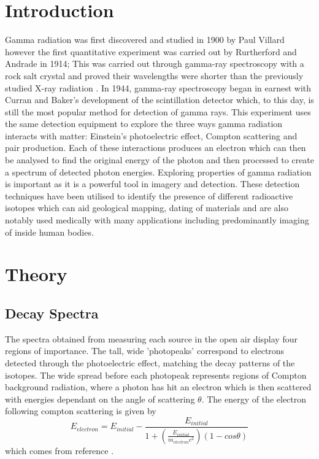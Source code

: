 \documentclass[11pt]{article} %
\newcommand{\citet}{\cite} %
\begin{document}
\newpage %

\section{Introduction} 
\label{intro}
    Gamma radiation was first discovered and studied in 1900 by Paul Villard \cite{GammaRadiation} however the first quantitative experiment was carried out by Rurtherford and Andrade in 1914; This was carried out through gamma-ray spectroscopy with a rock salt crystal and proved their wavelengths were shorter than the previously studied X-ray radiation \cite{Rutherford1914}. In 1944, gamma-ray spectroscopy began in earnest with Curran and Baker’s development of the scintillation detector \cite{SD} which, to this day, is still the most popular method for detection of gamma rays. This experiment uses the same detection equipment to explore the three ways gamma radiation interacts with matter: Einstein’s photoelectric effect, Compton scattering and pair production. Each of these interactions produces an electron which can then be analysed to find the original energy of the photon and then processed to create a spectrum of detected photon energies. Exploring properties of gamma radiation is important as it is a powerful tool in imagery and detection. These detection techniques have been utilised to identify the presence of different radioactive isotopes which can aid geological mapping, dating of materials and are also notably used medically with many applications including predominantly imaging of inside human bodies.

\section{Theory}
    \subsection{Decay Spectra}
        The spectra obtained from measuring each source in the open air display four regions of importance. The tall, wide 'photopeaks' correspond to electrons detected through the photoelectric effect, matching the decay patterns of the isotopes. The wide spread before each photopeak represents regions of Compton background radiation, where a photon has hit an electron which is then scattered with energies dependant on the angle of scattering $\theta$. The energy of the electron following compton scattering is given by
        \begin{equation}\label{compton}
            E_{electron} = E_{initial}-\frac{E_{initial}}{1+(\frac{E_{initial}}{m_{electron}c^{2}})(1-cos\theta)}
        \end{equation}
        which comes from reference \citet{compton}.
\end{document}
